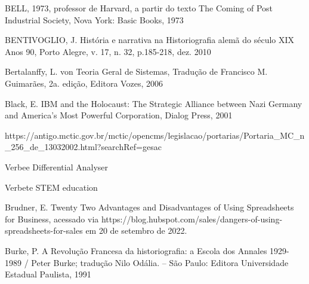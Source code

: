 \begin{flushleft}
[BELL, 1973]  BELL, 1973, professor de Harvard, a partir do texto The Coming of Post Industrial Society, Nova York: Basic Books, 1973
\end{flushleft}


\begin{flushleft}
[BENTIVOGLIO, 2010] BENTIVOGLIO, J. História e narrativa na Historiografia alemã do século XIX Anos 90, Porto Alegre, v. 17, n. 32, p.185-218, dez. 2010
\end{flushleft}


\begin{flushleft}
[BERTALANFFY, 1968] Bertalanffy, L. von Teoria Geral de Sistemas, Tradução de Francisco M. Guimarães, 2a. edição, Editora Vozes, 2006
\end{flushleft}


\begin{flushleft}
[BLACK, 2001] Black, E. IBM and the Holocaust: The Strategic Alliance between Nazi Germany and America's Most Powerful Corporation, Dialog Press, 2001
\end{flushleft}


\begin{flushleft}
[BRASIL, 2002] https://antigo.mctic.gov.br/mctic/opencms/legislacao/portarias/Portaria\_MC\_n\_256\_de\_13032002.html?searchRef=gesac
\end{flushleft}


\begin{flushleft}
[BRITANNICA, 2022] Verbee Differential Analyser
\end{flushleft}


\begin{flushleft}
[BRITANNICA, 2022a] Verbete STEM education
\end{flushleft}


\begin{flushleft}
[BRUDNER, 2022] Brudner, E. Twenty Two Advantages and Disadvantages of Using Spreadsheets for Business, acessado via https://blog.hubspot.com/sales/dangers-of-using-spreadsheets-for-sales em 20 de setembro de 2022.
\end{flushleft}


\begin{flushleft}
[BURKE, 1991] Burke, P. A Revolução Francesa da historiografia: a Escola dos Annales 1929-1989 / Peter Burke; tradução Nilo Odália. – São Paulo: Editora Universidade Estadual Paulista, 1991
\end{flushleft}


